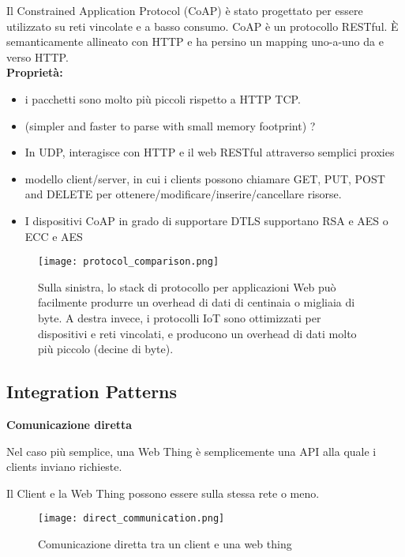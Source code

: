 Il Constrained Application Protocol (CoAP) è stato progettato per essere
utilizzato su reti vincolate e a basso consumo. CoAP è un protocollo RESTful.
È semanticamente allineato con HTTP e ha persino un mapping uno-a-uno da e
verso HTTP.\\

\textbf{Proprietà:}

\begin{itemize}
  \item i pacchetti sono molto più piccoli rispetto a HTTP TCP.
  \item (simpler and faster to parse with small memory footprint) ?
  \item In UDP, interagisce con HTTP e il web RESTful attraverso semplici
proxies
  \item modello client/server, in cui i clients possono chiamare GET, PUT,
POST and DELETE per ottenere/modificare/inserire/cancellare risorse.
  \item I dispositivi CoAP in grado di supportare DTLS supportano RSA e AES o
ECC e AES
\end{itemize}

\begin{figure}[H]
  \centering
  \texttt{[image: protocol\_comparison.png]}
  \caption{Sulla sinistra, lo stack di protocollo per applicazioni Web può
facilmente produrre un overhead di dati di centinaia o migliaia di byte.
A destra invece, i protocolli IoT sono ottimizzati per dispositivi e reti
vincolati, e producono un overhead di dati molto più piccolo (decine di
byte).}
  \label{fig:protocol_comparison}
\end{figure}

\subsection{Integration Patterns}

\textbf{Comunicazione diretta}

Nel caso più semplice, una Web Thing è semplicemente una API alla quale i
clients inviano richieste.

Il Client e la Web Thing possono essere sulla stessa rete o meno.

\begin{figure}[H]
  \centering
  \texttt{[image: direct\_communication.png]}
  \caption{Comunicazione diretta tra un client e una web thing}
  \label{fig:direct_communication}
\end{figure}

